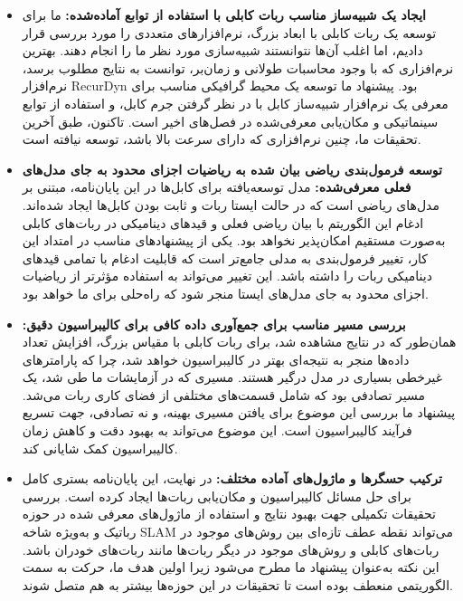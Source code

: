 \begin{itemize}
\item \textbf{ایجاد یک شبیه‌ساز مناسب ربات کابلی با استفاده از توابع آماده‌شده:}
ما برای توسعه یک ربات کابلی با ابعاد بزرگ، نرم‌افزارهای متعددی را مورد بررسی قرار دادیم، اما اغلب آن‌ها نتوانستند شبیه‌سازی مورد نظر ما را انجام دهند. بهترین نرم‌افزاری که با وجود محاسبات طولانی و زمان‌بر، توانست به نتایج مطلوب برسد، نرم‌افزار RecurDyn بود. پیشنهاد ما توسعه یک محیط گرافیکی مناسب برای معرفی یک نرم‌افزار شبیه‌ساز کابل با در نظر گرفتن جرم کابل، و استفاده از توابع سینماتیکی و مکان‌یابی معرفی‌شده در فصل‌های اخیر است. تاکنون، طبق آخرین تحقیقات ما، چنین نرم‌افزاری که دارای سرعت بالا باشد، توسعه نیافته است.

\item \textbf{توسعه فرمول‌بندی ریاضی بیان شده به ریاضیات اجزای محدود به جای مدل‌های فعلی معرفی‌شده:}
مدل توسعه‌یافته برای کابل‌ها در این پایان‌نامه، مبتنی بر مدل‌های ریاضی است که در حالت ایستا ربات و ثابت بودن کابل‌ها ایجاد شده‌اند. ادغام این الگوریتم با بیان ریاضی فعلی و قیدهای دینامیکی در ربات‌های کابلی به‌صورت مستقیم امکان‌پذیر نخواهد بود. یکی از پیشنهادهای مناسب در امتداد این کار، تغییر فرمول‌بندی به مدلی جامع‌تر است که قابلیت ادغام با تمامی قیدهای دینامیکی ربات را داشته باشد. این تغییر می‌تواند به استفاده مؤثرتر از ریاضیات اجزای محدود به جای مدل‌های ایستا منجر شود که راه‌حلی برای ما خواهد بود.

\item \textbf{بررسی مسیر مناسب برای جمع‌آوری داده کافی برای کالیبراسیون دقیق:}
همان‌طور که در نتایج مشاهده شد، برای ربات کابلی با مقیاس بزرگ، افزایش تعداد داده‌ها منجر به نتیجه‌ای بهتر در کالیبراسیون خواهد شد، چرا که پارامترهای غیرخطی بسیاری در مدل درگیر هستند. مسیری که در آزمایشات ما طی شد، یک مسیر تصادفی بود که شامل قسمت‌های مختلفی از فضای کاری ربات می‌شد. پیشنهاد ما بررسی این موضوع برای یافتن مسیری بهینه، و نه تصادفی، جهت تسریع فرآیند کالیبراسیون است. این موضوع می‌تواند به بهبود دقت و کاهش زمان کالیبراسیون کمک شایانی کند.


\item \textbf{ترکیب حسگر‌ها و ماژول‌های آماده مختلف:}
در نهایت، این پایان‌نامه بستری کامل برای حل مسائل کالیبراسیون و مکان‌یابی ربات‌ها ایجاد کرده است. بررسی تحقیقات تکمیلی جهت بهبود نتایج و استفاده از ماژول‌های معرفی شده در حوزه رباتیک و به‌ویژه شاخه SLAM می‌تواند نقطه عطف تازه‌ای بین روش‌های موجود در ربات‌های کابلی و روش‌های موجود در دیگر ربات‌ها مانند ربات‌های خودران باشد. این نکته به‌عنوان پیشنهاد ما مطرح می‌شود زیرا اولین هدف ما، حرکت به سمت الگوریتمی منعطف بوده است تا تحقیقات در این حوزه‌ها بیشتر به هم متصل شوند.


\end{itemize}
